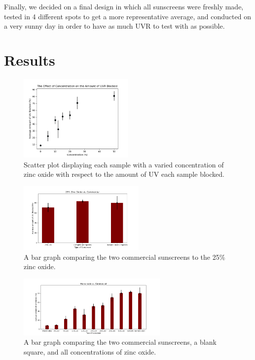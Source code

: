 \documentclass{article}
\begin{document}
Finally, we decided on a final design in which all sunscreens were freshly made, tested in 4 different spots to get a more representative average, and conducted on a very sunny day in order to have as much UVR to test with as possible. 

\FloatBarrier
\section{Results}
\begin{figure}
  \centering
  \includegraphics[width=0.5\textwidth]{SunscreenDataPlotZO.png}
  \caption{Scatter plot displaying each sample with a varied concentration of zinc oxide with respect to the amount of UV each sample blocked.}
\end{figure}
\begin{figure}
  \centering
  \includegraphics[width=0.55\textwidth]{25ZOvsCommercialPlot.png}
  \caption{A bar graph comparing the two commercial sunscreens to the 25\% zinc oxide.}
\end{figure}
\begin{figure}
  \centering
  \includegraphics[width=0.65\textwidth]{SunscreenDataPlot.png}
  \caption{A bar graph comparing the two commercial sunscreens, a blank square, and all concentrations of zinc oxide.}
\end{figure}
\end{document}
